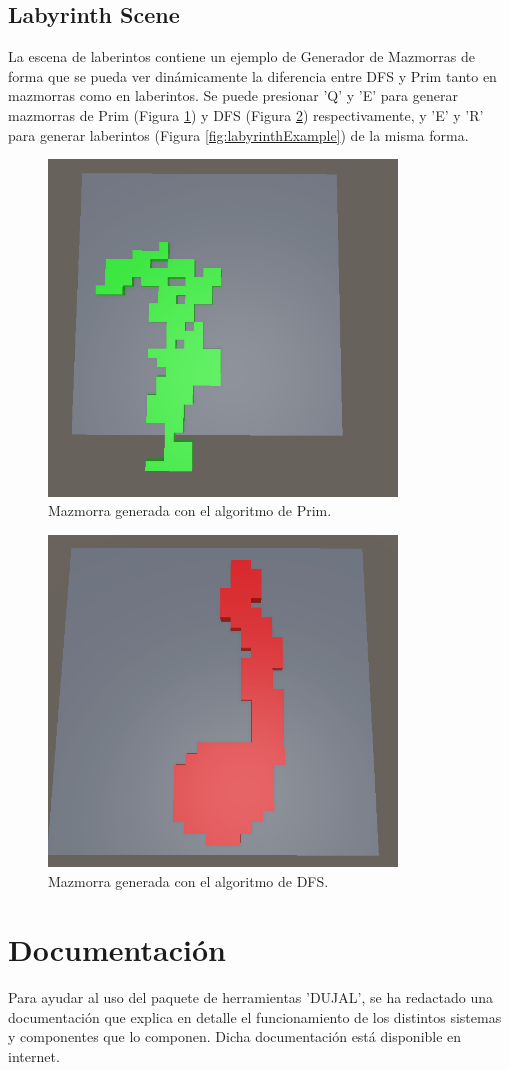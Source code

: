 \subsection{Labyrinth Scene}
La escena de laberintos contiene un ejemplo de Generador de Mazmorras de forma que se pueda ver dinámicamente la diferencia entre DFS y Prim tanto en mazmorras como en laberintos.  Se puede presionar
 'Q' y 'E' para generar mazmorras de Prim (Figura \ref{fig:primDungeon}) y DFS (Figura \ref{fig:DFSDungeon}) respectivamente, y 'E' y 'R' para generar laberintos (Figura \ref{fig:labyrinthExample}) de la misma forma.
 
 \begin{figure}[H]
   \centering
     \includegraphics[width=350px,clip=true]{primDungeon.png}
   \caption{Mazmorra generada con el algoritmo de Prim.}
   \label{fig:primDungeon}
 \end{figure}

\begin{figure}[H]
  \centering
    \includegraphics[width=350px,clip=true]{DFSDungeon.png}
  \caption{Mazmorra generada con el algoritmo de DFS.}
  \label{fig:DFSDungeon}
\end{figure}

\section{Documentación}
Para ayudar al uso del paquete de herramientas 'DUJAL', se ha redactado una documentación que explica en detalle el funcionamiento de los distintos sistemas 
y componentes que lo componen. Dicha documentación está disponible en internet\cite{dujalDoc}. 